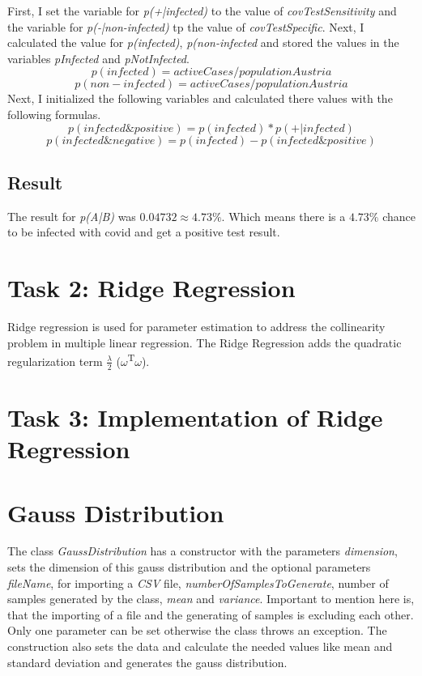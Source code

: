 \documentclass[10pt, a4paper, twocolumn]{article} %
\begin{document}
First, I set the variable for \textit{p(+|infected)} to the value of \textit{covTestSensitivity} and the variable for \textit{p(-|non-infected)} tp the value of \textit{covTestSpecific}.
Next, I calculated the value for \textit{p(infected)}, \textit{p(non-infected} and stored the values in the variables 
\textit{pInfected} and \textit{pNotInfected}. 
\[
p(infected) = \textit{activeCases} / \textit{populationAustria}
\]
\[
p(non-infected) = \textit{activeCases} / \textit{populationAustria}
\]
Next, I initialized the following variables and calculated there values with the following formulas.
\[
p(infected \& positive) = p(infected) * p(+|infected)
\]
\[
p(infected \& negative) = p(infected) - p(infected \& positive)
\]


\subsection{Result}
The result for \textit{p(A|B)} was $0.04732 \approx 4.73\%$. Which means there is a $4.73\%$ chance to be infected with covid and get a positive test result. 

\section{Task 2: Ridge Regression}
Ridge regression is used for parameter estimation to address the collinearity problem in multiple linear regression. 
\citep{ridgeRegression} The Ridge Regression adds the quadratic regularization term 
$\frac{\lambda}{2}$
(\textbf{$\omega$}\textsuperscript{T}\textbf{$\omega$}).


\section{Task 3: Implementation of Ridge Regression}

\section{Gauss Distribution}
The class \textit{GaussDistribution} has a constructor with the parameters \textit{dimension}, sets the dimension of this gauss distribution and the optional parameters \textit{fileName}, for importing a \textit{CSV} file, \textit{numberOfSamplesToGenerate}, number of samples generated by the class, \textit{mean} and  \textit{variance}. Important to mention here is, that the importing of a file and the generating of samples is excluding each other. Only one parameter can be set otherwise the class throws an exception. The construction also sets the data and calculate the needed values like mean and standard deviation and generates the gauss distribution. 
\end{document}

